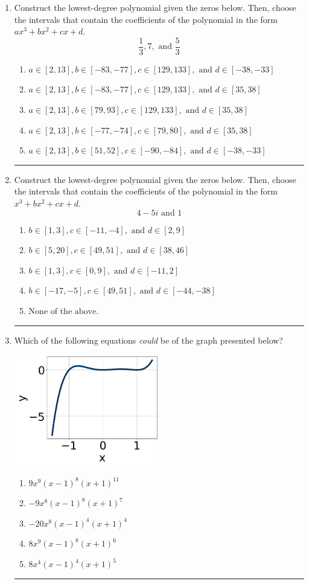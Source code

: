 \documentclass[14pt]{extbook}
\newcommand{\litem}[1]{\item#1\hspace*{-1cm}\rule{\textwidth}{0.4pt}}
\begin{document}
\begin{enumerate}
\litem{
Construct the lowest-degree polynomial given the zeros below. Then, choose the intervals that contain the coefficients of the polynomial in the form $ax^3+bx^2+cx+d$.\[ \frac{1}{3}, 7, \text{ and } \frac{5}{3} \]\begin{enumerate}[label=\Alph*.]
\item \( a \in [2, 13], b \in [-83, -77], c \in [129, 133], \text{ and } d \in [-38, -33] \)
\item \( a \in [2, 13], b \in [-83, -77], c \in [129, 133], \text{ and } d \in [35, 38] \)
\item \( a \in [2, 13], b \in [79, 93], c \in [129, 133], \text{ and } d \in [35, 38] \)
\item \( a \in [2, 13], b \in [-77, -74], c \in [79, 80], \text{ and } d \in [35, 38] \)
\item \( a \in [2, 13], b \in [51, 52], c \in [-90, -84], \text{ and } d \in [-38, -33] \)

\end{enumerate} }
\litem{
Construct the lowest-degree polynomial given the zeros below. Then, choose the intervals that contain the coefficients of the polynomial in the form $x^3+bx^2+cx+d$.\[ 4 - 5 i \text{ and } 1 \]\begin{enumerate}[label=\Alph*.]
\item \( b \in [1, 3], c \in [-11, -4], \text{ and } d \in [2, 9] \)
\item \( b \in [5, 20], c \in [49, 51], \text{ and } d \in [38, 46] \)
\item \( b \in [1, 3], c \in [0, 9], \text{ and } d \in [-11, 2] \)
\item \( b \in [-17, -5], c \in [49, 51], \text{ and } d \in [-44, -38] \)
\item \( \text{None of the above.} \)

\end{enumerate} }
\litem{
Which of the following equations \textit{could} be of the graph presented below?
\begin{center}
    \includegraphics[width=0.5\textwidth]{../Figures/polyGraphToFunctionB.png}
\end{center}
\begin{enumerate}[label=\Alph*.]
\item \( 9x^{9} (x - 1)^{8} (x + 1)^{11} \)
\item \( -9x^{8} (x - 1)^{8} (x + 1)^{7} \)
\item \( -20x^{8} (x - 1)^{4} (x + 1)^{4} \)
\item \( 8x^{9} (x - 1)^{8} (x + 1)^{6} \)
\item \( 8x^{4} (x - 1)^{4} (x + 1)^{5} \)


\end{enumerate}}
\end{enumerate}
\end{document}
